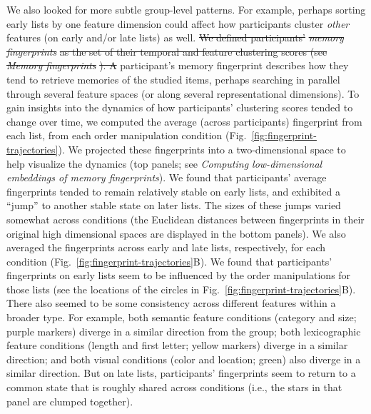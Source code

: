 \documentclass[11pt]{article}
\providecommand{\DIFaddtex}[1]{{\protect\color{blue}\uwave{#1}}} %
\providecommand{\DIFdeltex}[1]{{\protect\color{red}\sout{#1}}}                      %
\providecommand{\DIFaddbegin}{} %
\providecommand{\DIFaddend}{} %
\providecommand{\DIFdelbegin}{} %
\providecommand{\DIFdelend}{} %
\providecommand{\DIFadd}[1]{\texorpdfstring{\DIFaddtex{#1}}{#1}} %
\providecommand{\DIFdel}[1]{\texorpdfstring{\DIFdeltex{#1}}{}} %
\newcommand{\DIFscaledelfig}{0.5}
\newlength{\DIFdelgraphicswidth} %
\newlength{\DIFdelgraphicsheight} %
\newcommand{\DIFaddincludegraphics}[2][]{{\color{blue}\fbox{\DIFOincludegraphics[#1]{#2}}}} %
\newcommand{\DIFdelincludegraphics}[2][]{%
\sbox{\DIFdelgraphicsbox}{\DIFOincludegraphics[#1]{#2}}%
\settoboxwidth{\DIFdelgraphicswidth}{\DIFdelgraphicsbox} %
\settoboxtotalheight{\DIFdelgraphicsheight}{\DIFdelgraphicsbox} %
\scalebox{\DIFscaledelfig}{%
\parbox[b]{\DIFdelgraphicswidth}{\usebox{\DIFdelgraphicsbox}\\[-\baselineskip] \rule{\DIFdelgraphicswidth}{0em}}\llap{\resizebox{\DIFdelgraphicswidth}{\DIFdelgraphicsheight}{%
\setlength{\unitlength}{\DIFdelgraphicswidth}%
\begin{picture}(1,1)%
\thicklines\linethickness{2pt} %
{\color[rgb]{1,0,0}\put(0,0){\framebox(1,1){}}}%
{\color[rgb]{1,0,0}\put(0,0){\line( 1,1){1}}}%
{\color[rgb]{1,0,0}\put(0,1){\line(1,-1){1}}}%
\end{picture}%
}\hspace*{3pt}}} %
} %
\DeclareRobustCommand{\DIFaddbegin}{\DIFOaddbegin \let\includegraphics\DIFaddincludegraphics} %
\DeclareRobustCommand{\DIFaddend}{\DIFOaddend \let\includegraphics\DIFOincludegraphics} %
\DeclareRobustCommand{\DIFdelbegin}{\DIFOdelbegin \let\includegraphics\DIFdelincludegraphics} %
\DeclareRobustCommand{\DIFdelend}{\DIFOaddend \let\includegraphics\DIFOincludegraphics} %
\begin{document}
We also looked for more subtle group-level patterns. For example, perhaps
sorting early lists by one feature dimension could affect how participants
cluster \textit{other} features (on early and/or late lists) as well. \DIFdelbegin \DIFdel{We
defined participants' }\textit{\DIFdel{memory fingerprints}} %
\DIFdel{as the set of their temporal
and feature clustering scores (see }\textit{\DIFdel{Memory fingerprints}}%
\DIFdel{). A
}\DIFdelend \DIFaddbegin \DIFadd{As
described above, a }\DIFaddend participant's memory fingerprint describes how they tend to
retrieve memories of the studied items, perhaps searching in parallel through
several feature spaces (or along several representational dimensions). To gain
insights into the dynamics of how participants' clustering scores tended to
change over time, we computed the average (across participants) fingerprint
from each list, from each order manipulation condition
(Fig.~\ref{fig:fingerprint-trajectories}). We projected these fingerprints into
a two-dimensional space to help visualize the dynamics (top panels; see
\textit{Computing low-dimensional embeddings of memory fingerprints}). We found
that participants' average fingerprints tended to remain relatively stable on
early lists, and exhibited a ``jump'' to another stable state on later lists.
The sizes of these jumps varied somewhat across conditions (the Euclidean
distances between fingerprints in their original high dimensional spaces are
displayed in the bottom panels). We also averaged the fingerprints across early
and late lists, respectively, for each condition
(Fig.~\ref{fig:fingerprint-trajectories}B). We found that participants'
fingerprints on early lists seem to be influenced by the order manipulations
for those lists (see the locations of the circles in
Fig.~\ref{fig:fingerprint-trajectories}B). There also seemed to be some
consistency across different features within a broader type. For example, both
semantic feature conditions (category and size; purple markers) diverge in a
similar direction from the group; both lexicographic feature conditions (length
and first letter; yellow markers) diverge in a similar direction; and both
visual conditions (color and location; green) also diverge in a similar
direction. But on late lists, participants' fingerprints seem to return to a
common state that is roughly shared across conditions (i.e., the stars in that
panel are clumped together).
\end{document}
